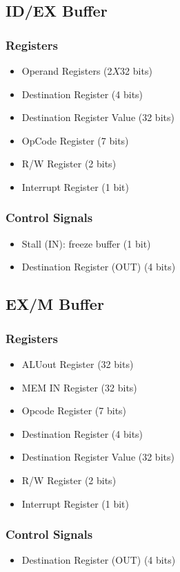 \subsection{ID/EX Buffer}
\subsubsection{Registers}
\begin{itemize}
    \item Operand Registers (2$X$32 bits)
    \item Destination Register (4 bits)
    \item Destination Register Value (32 bits)
    \item OpCode Register (7 bits)
    \item R/W Register (2 bits)
    \item Interrupt Register (1 bit)
\end{itemize}

\subsubsection{Control Signals}
\begin{itemize}
    \item Stall (IN): freeze buffer (1 bit)
    \item Destination Register (OUT) (4 bits)
\end{itemize}

\subsection{EX/M Buffer}
\subsubsection{Registers}
\begin{itemize}
    \item ALUout Register (32 bits)
    \item MEM IN Register (32 bits)
    \item Opcode Register (7 bits)
    \item Destination Register (4 bits)
    \item Destination Register Value (32 bits)
    \item R/W Register (2 bits)
    \item Interrupt Register (1 bit)
\end{itemize}

\subsubsection{Control Signals}
\begin{itemize}
    \item Destination Register (OUT) (4 bits)
\end{itemize}


